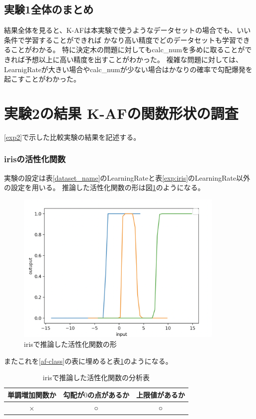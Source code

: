 \subsection{実験1全体のまとめ}
結果全体を見ると、K-AFは本実験で使うようなデータセットの場合でも、いい条件で学習することができれば
かなり高い精度でどのデータセットも学習できることがわかる。
特に決定木の問題に対してもcalc\_numを多めに取ることができれば予想以上に高い精度を出すことがわかった。
複雑な問題に対しては、LearnigRateが大きい場合やcalc\_numが少ない場合はかなりの確率で勾配爆発を起こすことがわかった。


\section{実験2の結果 K-AFの関数形状の調査}
\label{evo2}
\ref{exp2}で示した比較実験の結果を記述する。





\subsubsection{irisの活性化関数}
実験の設定は表\ref{dataset_name}のLearningRateと表\ref{exp:iris}のLearningRate以外の設定を用いる。
推論した活性化関数の形は図\ref{infer_iris}のようになる。
\begin{figure}[hbtp]
    \begin{center}
        \includegraphics[width=10cm]{asset/iris-0.1.png}
            \caption{irisで推論した活性化関数の形}
            \label{infer_iris}
    \end{center}
\end{figure}

またこれを\ref{af-class}の表に埋めると表\ref{anal_iris}のようになる。
\begin{table}[htbp]
    \begin{center}
        \caption{irisで推論した活性化関数の分析表}
        \label{anal_iris}
        \vspace{2mm} 
        \begin{tabular}{ |c|c|c| }
        \hline
        単調増加関数か & 勾配が$ 0 $の点があるか & 上限値があるか   \\
        \hline
        × & ○ & ○   \\
        \hline
        \end{tabular}
    \end{center}
\end{table}



